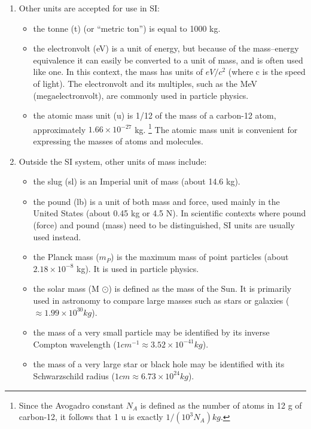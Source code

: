 \documentclass{book}
\begin{document}
	\begin{enumerate}
		\item Other units are accepted for use in SI:
		\begin{itemize}
			\item the tonne (t) (or ``metric ton'') is equal to 1000 kg.
			\item the electronvolt (eV) is a unit of energy, but because of the mass–energy equivalence it can easily be converted to a unit of mass, and is often used like one. In this context, the mass has units of $eV/c^2$ (where c is the speed of light). The electronvolt and its multiples, such as the MeV (megaelectronvolt), are commonly used in particle physics.
			\item the atomic mass unit (u) is 1/12 of the mass of a carbon-12 atom, approximately $1.66 \times 10^{-27}$ kg. \footnote{Since the Avogadro constant $N_A$ is defined as the number of atoms in 12 g of carbon-12, it follows that 1 u is exactly $1/(10^3 N_A) kg$.} The atomic mass unit is convenient for expressing the masses of atoms and molecules.
		\end{itemize}   
		
		\item Outside the SI system, other units of mass include:
		\begin{itemize}
			\item the slug (sl) is an Imperial unit of mass (about 14.6 kg).
			\item the pound (lb) is a unit of both mass and force, used mainly in the United States (about 0.45 kg or 4.5 N). In scientific contexts where pound (force) and pound (mass) need to be distinguished, SI units are usually used instead.
			\item the Planck mass ($m_P$) is the maximum mass of point particles (about $ 2.18 \times 10^{-8} $ kg). It is used in particle physics.
			\item the solar mass (M $\odot$) is defined as the mass of the Sun. It is primarily used in astronomy to compare large masses such as stars or galaxies ($\approx 1.99 \times 10^{30} kg$).
			\item the mass of a very small particle may be identified by its inverse Compton wavelength ($1 cm^{-1} \approx 3.52 \times 10^{-41} kg$).
			\item the mass of a very large star or black hole may be identified with its Schwarzschild radius ($1 cm \approx 6.73 \times 10^{24} kg$).
		\end{itemize}
	\end{enumerate}
	
\end{document}
